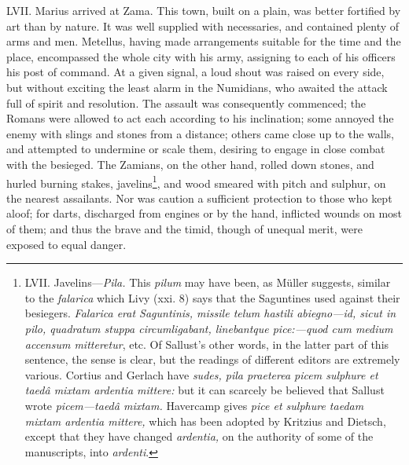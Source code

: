 LVII. Marius arrived at Zama. This town, built on a plain, was better
fortified by art than by nature. It was well supplied with
necessaries, and contained plenty of arms and men. Metellus, having
made arrangements suitable for the time and the place, encompassed the
whole city with his army, assigning to each of his officers his post
of command. At a given signal, a loud shout was raised on every side,
but without exciting the least alarm in the Numidians, who awaited the
attack full of spirit and resolution. The assault was consequently
commenced; the Romans were allowed to act each according to his
inclination; some annoyed the enemy with slings and stones from a
distance; others came close up to the walls, and attempted to
undermine or scale them, desiring to engage in close combat with the
besieged. The Zamians, on the other hand, rolled down stones, and
hurled burning stakes, javelins\footnote{LVII. Javelins—\emph{Pila.} This \emph{pilum} may have been, as Müller
suggests, similar to the \emph{falarica} which Livy (xxi. 8) says that the
Saguntines used against their besiegers. \emph{Falarica erat Saguntinis,
missile telum hastili abiegno—id, sicut in pilo, quadratum stuppa
circumligabant, linebantque pice:—quod cum medium accensum mitteretur},
etc. Of Sallust's other words, in the latter part of this sentence,
the sense is clear, but the readings of different editors are extremely
various. Cortius and Gerlach have \emph{sudes, pila praeterea picem sulphure
et taedâ mixtam ardentia mittere:} but it can scarcely be believed that
Sallust wrote \emph{picem—taedâ mixtam.} Havercamp gives \emph{pice et sulphure
taedam mixtam ardentia mittere,} which has been adopted by Kritzius and
Dietsch, except that they have changed \emph{ardentia,} on the authority of
some of the manuscripts, into \emph{ardenti}.}, and wood smeared with pitch and
sulphur, on the nearest assailants. Nor was caution a sufficient
protection to those who kept aloof; for darts, discharged from engines
or by the hand, inflicted wounds on most of them; and thus the brave and
the timid, though of unequal merit, were exposed to equal danger.

